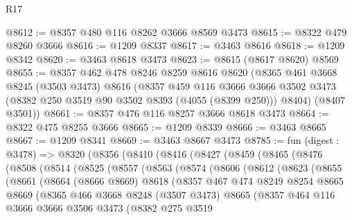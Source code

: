 \begin{lexlean}{R17}
\begin{coremodule}
@8612 := @8357 @480 @116 @8262 @3666 @8569 @3473
@8615 := @8322 @479 @8260 @3666
@8616 := @1209 @8337
@8617 := @3463 @8616
@8618 := @1209 @8342
@8620 := @3463 @8618 @3473
@8623 := @8615 (@8617 @8620) @8569
@8655 := @8357
    @462
    @478
    @8246
    @8259
    @8616
    @8620
    (@8365
      @461
      @3668
      @8245
      (@3503 @3473)
      @8616
      (@8357
        @459
        @116
        @3666
        @3666
        @3502
        @3473
        (@8382 @250 @3519 @90 @3502 @8393 (@4055 (@8399 @250)))
        @8404)
      (@8407 @3501))
@8661 := @8357 @476 @116 @8257 @3666 @8618 @3473
@8664 := @8322 @475 @8255 @3666
@8665 := @1209 @8339
@8666 := @3463 @8665
@8667 := @1209 @8341
@8669 := @3463 @8667 @3473
@8785 := fun (digest : @3478) =>
  @8320
    (@8356
      (@8410
        (@8416
          (@8427
            (@8459
              (@8465
                (@8476
                  (@8508
                    (@8514
                      (@8525
                        (@8557
                          (@8563
                            (@8574
                              (@8606
                                (@8612
                                  (@8623
                                    (@8655
                                      (@8661
                                        (@8664
                                          (@8666 @8669)
                                          @8618
                                          (@8357
                                            @467
                                            @474
                                            @8249
                                            @8254
                                            @8665
                                            @8669
                                            (@8365
                                              @466
                                              @3668
                                              @8248
                                              (@3507 @3473)
                                              @8665
                                              (@8357
                                                @464
                                                @116
                                                @3666
                                                @3666
                                                @3506
                                                @3473
                                                (@8382
                                                  @275
                                                  @3519

\end{coremodule}
\end{lexlean}

